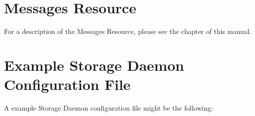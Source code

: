 



\section{Messages Resource}
\label{MessagesResource1}

For a description of the Messages Resource, please see the
 chapter of this
manual.

\section{Example Storage Daemon Configuration File}
\label{ExampleStorageConfiguration}

A example Storage Daemon configuration file might be the following:

